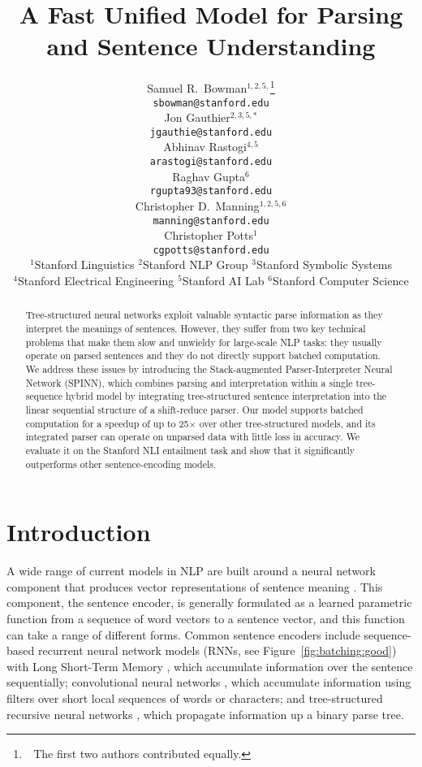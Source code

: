 \documentclass[11pt]{article}
\title{A Fast Unified Model for Parsing and Sentence Understanding}
\author{
Samuel R.\ Bowman$^{1,2,5,}$\thanks{~\,The first two authors contributed equally.} \\
\texttt{\small sbowman@stanford.edu} \\
\And
Jon Gauthier$^{2,3,5,*}$ \\
\texttt{\small jgauthie@stanford.edu} \\
\And
Abhinav Rastogi$^{4,5}$ \\
\texttt{\small arastogi@stanford.edu} \\
\AND
Raghav Gupta$^{6}$ \\
\texttt{\small rgupta93@stanford.edu} \\
\And
Christopher D.\ Manning$^{1,2,5,6}$\\
\texttt{\small manning@stanford.edu}\\
\And
Christopher Potts$^{1}$\\
\texttt{\small cgpotts@stanford.edu}
\AND\\[-3ex]
{$^{1}$Stanford Linguistics\quad
$^{2}$Stanford NLP Group\quad
$^{3}$Stanford Symbolic Systems}\\
{$^{4}$Stanford Electrical Engineering\quad
$^{5}$Stanford AI Lab\quad
$^{6}$Stanford Computer Science}
}
\date{}
\begin{document}
\maketitle
\begin{abstract}

Tree-structured neural networks exploit valuable syntactic parse information as they interpret the meanings of sentences. However, they suffer from two key technical problems that make them slow and unwieldy for large-scale NLP tasks: they usually operate on parsed sentences and they do not directly support batched computation. We address these issues by introducing the Stack-augmented Parser-Interpreter Neural Network (SPINN), which combines parsing and interpretation within a single tree-sequence hybrid model by integrating tree-structured sentence interpretation into the linear sequential structure of a shift-reduce parser. Our model supports batched computation for a speedup of up to 25$\times$ over other tree-structured models, and its integrated parser can operate on unparsed data with little loss in accuracy. We evaluate it on the Stanford NLI entailment task and show that it significantly outperforms other sentence-encoding models.
\end{abstract}

\section{Introduction}




A wide range of current models in NLP are built around a neural network component that produces vector representations of sentence meaning \citep[e.g.,][]{sutskever2014sequence,tai2015improved}. This component, the sentence encoder, is generally formulated as a learned parametric function from a sequence of word vectors to a sentence vector, and this function can take a range of different forms. Common sentence encoders include sequence-based recurrent neural network models (RNNs, see Figure~\ref{fig:batching:good}) with Long Short-Term Memory \citep[LSTM,][]{hochreiter1997long}, which accumulate information over the sentence sequentially; convolutional neural networks \citep{kalchbrenner2014convolutional,DBLP:journals/corr/ZhangZL15}, which accumulate information using filters over short local sequences of words or characters; and tree-structured recursive neural networks \citep[TreeRNNs,][see Figure~\ref{fig:batching:bad}]{goller1996learning,socher2011parsing}, which propagate information up a binary parse tree.
\end{document}
